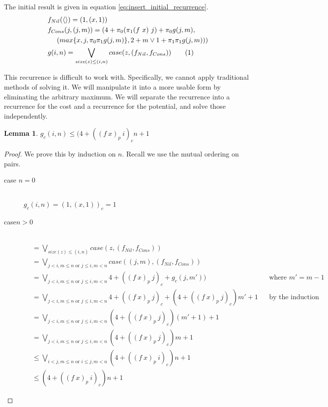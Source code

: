 \documentclass[12pt,letterpaper]{article}
\newtheorem{lemma}[theorem]{Lemma}
\newcommand\numberthis{\addtocounter{equation}{1}\tag{\theequation}}
\begin{document}
The initial result is given in equation \ref{eq:insert_initial_recurrence}.
\begin{align*}
  &f_{Nil}(\langle\rangle) = (1,(x,1)) \\ 
  &f_{Cons}(j,(j,m)) = (4 + \pi_0(\pi_1(f\ x)\ j) + \pi_0g(j,m), \\
  &\ \ \ \ (max\{x,j,\pi_0\pi_1g(j,m)\}, 2+m \vee 1 + \pi_1\pi_1g(j,m))) \\
  \label{eq:insert_initial_recurrence}
  &g(i,n) = \bigvee_{size(z) \leq (i,n)} case(z, (f_{Nil},f_{Cons})) \numberthis
\end{align*}

This recurrence is difficult to work with.
Specifically, we cannot apply traditional methods of solving it.
We will manipulate it into a more usable form by eliminating the arbitrary maximum.
We will separate the recurrence into a recurrence for the cost and a recurrence for the potential, and solve those independently.

\begin{lemma}
  \label{lem:insert_rec_cost}
  $g_c(i,n) \leq (4 + ((f\ x)_p\ i)_c n + 1$
\end{lemma}
\begin{proof}
  We prove this by induction on $n$.
  Recall we use the mutual ordering on pairs.
  \begin{description}
    \item[case $n=0$]\hfill \\
      $g_c(i,n) = (1, (x, 1))_c = 1$
    \item[case$n>0$]\hfill \\
      \begin{align*}
        &= \bigvee_{size(z) \leq (i,n)} case(z, (f_{Nil}, f_{Cons})) &&\\
        &= \bigvee_{j < i, m \leq n \text{ or } j \leq i, m < n} case((j, m), (f_{Nil}, f_{Cons})) &&\\
        &= \bigvee_{j < i, m \leq n \text{ or } j \leq i, m < n} 4 + ((f\ x)_p\ j)_c + g_c(j, m')) &&\text{where $m' = m - 1$}\\
        &= \bigvee_{j < i, m \leq n \text{ or } j \leq i, m < n} 4 + ((f\ x)_p\ j)_c + (4 + ((f\ x)_p\ j)_c)m' + 1 &&\text{by the induction hypothesis}\\
        &= \bigvee_{j < i, m \leq n \text{ or } j \leq i, m < n} (4 + ((f\ x)_p\ j)_c) (m' + 1) + 1 &&\\
        &= \bigvee_{j < i, m \leq n \text{ or } j \leq i, m < n} (4 + ((f\ x)_p\ j)_c) m + 1 &&\\
        &\leq \bigvee_{i < j, m \leq n \text{ or } i \leq j, m < n} (4 + ((f\ x)_p\ i)_c) n + 1 &&\\
        &\leq (4 + ((f\ x)_p\ i)_c) n + 1&&
      \end{align*}
  \end{description}
\end{proof}
\end{document}
